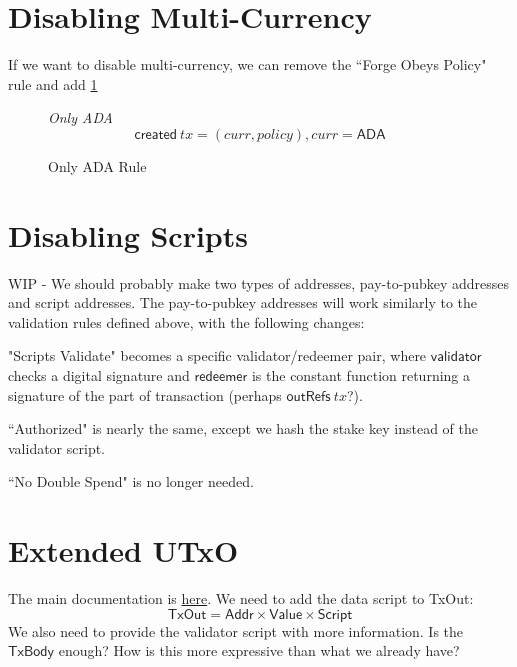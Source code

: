 \documentclass[11pt,a4paper]{article}
\newcommand{\var}[1]{\mathit{#1}}
\newcommand{\fun}[1]{\mathsf{#1}}
\newcommand{\type}[1]{\mathsf{#1}}
\newcommand{\Script}{\type{Script}}
\newcommand{\Addr}{\type{Addr}}
\newcommand{\Value}{\type{Value}}
\newcommand{\TxOut}{\type{TxOut}}
\newcommand{\TxBody}{\type{TxBody}}
\newcommand{\created}[1]{\fun{created}\ \var{#1}}
\newcommand{\outRefs}[1]{\fun{outRefs}\ \var{#1}}
\begin{document}
\section{Disabling Multi-Currency}

If we want to disable multi-currency, we can remove the ``Forge Obeys Policy" rule and
add \cref{fig:only_ada_rule}
\begin{figure}
\emph{Only ADA}
%
\begin{equation*}
\created tx = (curr, policy), curr = \mathsf{ADA}
\end{equation*}

\caption{Only ADA Rule}
\label{fig:only_ada_rule}
\end{figure}


\section{Disabling Scripts}

WIP - We should probably make two types of addresses, pay-to-pubkey addresses and script addresses.
The pay-to-pubkey addresses will work similarly to the validation rules defined above, with the
following changes:

"Scripts Validate" becomes a specific validator/redeemer pair, where $\mathsf{validator}$ checks a
digital signature and $\mathsf{redeemer}$ is the constant function returning a signature of the
part of transaction (perhaps $\outRefs tx$?).

``Authorized" is nearly the same, except we hash the stake key instead of the validator script.

``No Double Spend" is no longer needed.

\section{Extended UTxO}

The main documentation is \href{https://github.com/input-output-hk/plutus/blob/master/extended-utxo-spec/extended-utxo-specification.tex}{here}.
We need to add the data script to TxOut:
$$ \TxOut = \Addr \times \Value \times \Script $$
We also need to provide the validator script with more information.  Is the $\TxBody$ enough?
How is this more expressive than what we already have?



\end{document}
